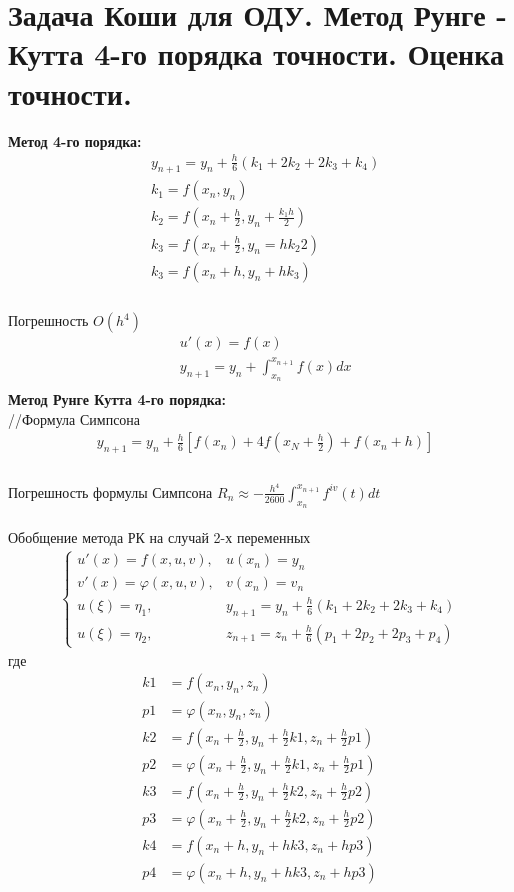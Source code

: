 \documentclass[12pt,a4paper]{article}
\begin{document}
	\section{Задача Коши для ОДУ. Метод Рунге - Кутта 4-го порядка точности. Оценка точности.}
	\textbf{Метод 4-го порядка: }\\
	\begin{align*}
	&y_{n+1} = y_n + \frac{h}{6} (k_1 + 2k_2 + 2k_3 + k_4)\\
	&k_1 = f(x_n, y_n)\\
	&k_2 = f(x_n + \frac{h}{2}, y_n + \frac{k_1h}{2})\\
	&k_3 = f(x_n + \frac{h}{2}, y_n = {hk_2}{2})\\
	&k_3 = f(x_n + h, y_n + hk_3)\\
	\end{align*}\\
	Погрешность $O(h^4)$\\
	\begin{align*}
	&u'(x) = f(x)\\
	&y_{n+1} = y_n + \int_{x_n}^{x_{n+1}}f(x) dx\\	
	\end{align*}
	\textbf{Метод Рунге Кутта 4-го порядка: }\\
	//Формула Симпсона\\
	\begin{align*}
	&y_{n+1} = y_n + \frac{h}{6} \left[ f(x_n) + 4f(x_N  + \frac{h}{2}) + f(x_n + h)\right]\\	
	\end{align*}\\
	Погрешность формулы Симпсона $R_n \approx - \displaystyle\frac{h^4}{2600}\int_{x_n}^{x_{n+1}}f^{iv}(t)dt$\\\\
	Обобщение метода РК на случай 2-х переменных\\
	\begin{align*}
	\begin{cases}
	u'(x) = f(x, u, v), &u(x_n) = y_n\\
	v'(x) = \varphi(x, u, v), &v(x_n) = v_n\\
	u(\xi) = \eta_1, &y_{n+1} = y_n + \frac{h}{6}(k_1 + 2k_2 + 2k_3 + k_4)\\
	u(\xi) = \eta_2, &z_{n+1} = z_n + \frac{h}{6}(p_1 + 2p_2 + 2p_3 + p_4)
	\end{cases}
	\end{align*}
	где 
	\begin{align*}
	k1 &= f(x_n, y_n, z_n)\\
	p1 &= \varphi(x_n, y_n, z_n)\\
	k2 &= f(x_n + \frac{h}{2}, y_n + \frac{h}{2}k1, z_n + \frac{h}{2}p1)\\
	p2 &= \varphi(x_n + \frac{h}{2}, y_n + \frac{h}{2}k1, z_n + \frac{h}{2}p1)\\
	k3 &= f(x_n + \frac{h}{2}, y_n + \frac{h}{2}k2, z_n + \frac{h}{2}p2)\\
	p3 &= \varphi(x_n + \frac{h}{2}, y_n + \frac{h}{2}k2, z_n + \frac{h}{2}p2)\\
	k4 &= f(x_n + h, y_n + hk3, z_n + hp3)\\
	p4 &= \varphi(x_n + h, y_n + hk3, z_n + hp3)\\
	\end{align*}
\end{document}
